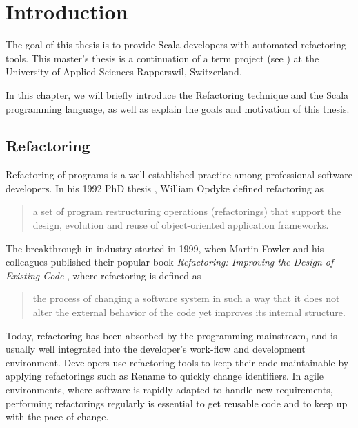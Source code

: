 \documentclass[10pt,a4paper,oneside]{scrreprt}
\begin{document}
\newpage


\chapter{Introduction} \label{chapter:introduction}

The goal of this thesis is to provide Scala developers with automated refactoring tools. This master's thesis is a continuation of a term project (see \cite{ScalaRefactoring}) at the University of Applied Sciences Rapperswil, Switzerland. 

In this chapter, we will briefly introduce the Refactoring technique and the Scala programming language, as well as explain the goals and motivation of this thesis.

\section{Refactoring}

Refactoring of programs is a well established practice among professional software developers. In his 1992 PhD thesis \cite{OpdykeThesis}, William Opdyke defined refactoring as 

\begin{quotation}
a set of program restructuring operations (refactorings) that support the design, evolution and reuse of object-oriented application frameworks.
\end{quotation}

The breakthrough in industry started in 1999, when Martin Fowler and his colleagues published their popular book \textit{Refactoring: Improving the Design of Existing Code} \cite{FowlerRefactoring}, where refactoring is defined as 

\begin{quotation}
the process of changing a software system in such a way that it does not alter the external behavior of the code yet improves its internal structure.
\end{quotation} 

Today, refactoring has been absorbed by the programming mainstream, and is usually well integrated into the developer's work-flow and development environment. Developers use refactoring tools to keep their code maintainable by applying refactorings such as Rename to quickly change identifiers. In agile environments, where software is rapidly adapted to handle new requirements, performing refactorings regularly is essential to get reusable code and to keep up with the pace of change.
\end{document}
